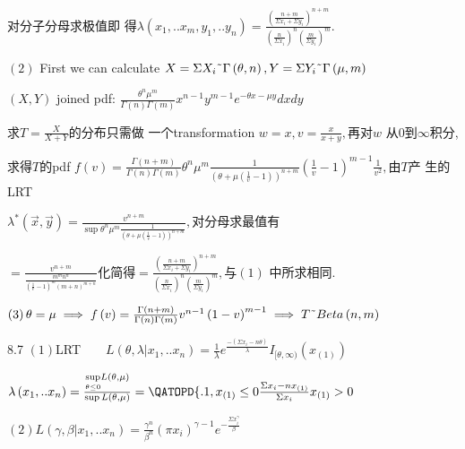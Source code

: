 \documentclass{ctexart}
\begin{document}
对分子分母求极值即%
得$\lambda \left( x_{1},..x_{m},y_{1},..y_{n}\right) =\frac{\left( 
\frac{n+m}{\Sigma x_{i}+\Sigma y_{i}}\right) ^{n+m}}{\left( \frac{n}{\Sigma
x_{i}}\right) ^{n}\left( \frac{m}{\Sigma y_{i}}\right) ^{m}}.$

$\left( 2\right) $ First we can calculate $X=\Sigma X_{i}\symbol{126}\Gamma
\left( \theta ,n\right) ,Y=\Sigma Y_{i}\symbol{126}\Gamma \left( \mu
,m\right) $

$\left( X,Y\right) $ joined pdf: $\frac{\theta ^{n}\mu ^{m}}{\Gamma \left(
n\right) \Gamma \left( m\right) }x^{n-1}y^{m-1}e^{-\theta x-\mu y}dxdy$

求$T=\frac{X}{X+Y}$的分布只需做%
一个transformation $w=x,v=\frac{x}{x+y},$再对$w$%
从0到$\infty $积分,

求得$T$的pdf $f\left( v\right) =\frac{\Gamma \left(
n+m\right) }{\Gamma \left( n\right) \Gamma \left( m\right) }\theta ^{n}\mu
^{m}\frac{1}{\left( \theta +\mu \left( \frac{1}{v}-1\right) \right) ^{n+m}}%
\left( \frac{1}{v}-1\right) ^{m-1}\frac{1}{v^{2}},$由$T$产%
生的LRT

$\lambda ^{\ast }\left( \vec{x},\vec{y}\right) =\frac{v^{n+m}}{\sup \theta
^{n}\mu ^{m}\frac{1}{\left( \theta +\mu \left( \frac{1}{v}-1\right) \right)
^{n+m}}},$对分母求最值有

$=\frac{v^{n+m}}{\frac{m^{m}n^{n}}{\left( \frac{1}{v}-1\right) ^{m}\left(
m+n\right) ^{m+n}}}$化简得$=\frac{\left( \frac{n+m}{\Sigma
x_{i}+\Sigma y_{i}}\right) ^{n+m}}{\left( \frac{n}{\Sigma x_{i}}\right)
^{n}\left( \frac{m}{\Sigma y_{i}}\right) ^{m}},$与$\left( 1\right) $%
中所求相同$.$

$\left( 3\right) \theta =\mu \implies f\left( v\right) =\frac{\Gamma \left(
n+m\right) }{\Gamma \left( n\right) \Gamma \left( m\right) }v^{n-1}\left(
1-v\right) ^{m-1}\implies T\symbol{126}Beta\left( n,m\right) $

8.7 $\left( 1\right) $LRT$\qquad L\left( \theta ,\lambda
|x_{1},..x_{n}\right) =\frac{1}{\lambda }e^{\frac{-\left( \Sigma
x_{i}-n\theta \right) }{\lambda }}I_{[\theta ,\infty )}\left( x_{\left(
1\right) }\right) $

$\lambda \left( x_{1},..x_{n}\right) =\frac{\underset{\theta \leq 0}{\sup }%
L\left( \theta ,\mu \right) }{\sup L\left( \theta ,\mu \right) }=\QATOPD\{ .
{1,x_{\left( 1\right) }\leq 0}{\frac{\Sigma x_{i}-nx_{\left( 1\right) }}{%
\Sigma x_{i}}x_{\left( 1\right) }>0}$

$\left( 2\right) L\left( \gamma ,\beta |x_{1},..x_{n}\right) =\frac{\gamma
^{n}}{\beta ^{n}}\left( \pi x_{i}\right) ^{\gamma -1}e^{-\frac{\Sigma
x_{i}^{\gamma }}{\beta }}$
\end{document}
